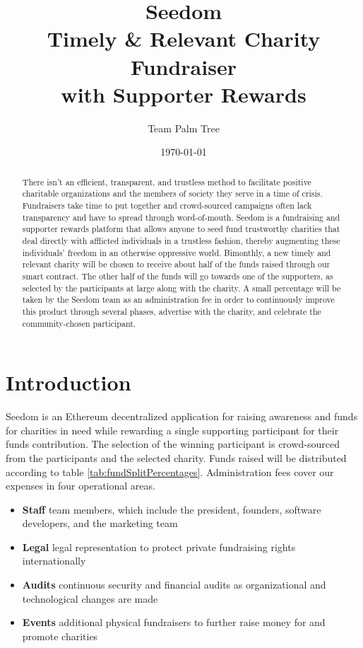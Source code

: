 \documentclass[11pt]{article}
\begin{document}
\title{%
\Huge Seedom \\[4mm]
\large Timely \& Relevant Charity Fundraiser \\[1mm]
with Supporter Rewards}
\author{Team Palm Tree}
\date{\today}
\maketitle

\begin{abstract}
There isn't an efficient, transparent, and trustless method to facilitate positive charitable organizations and the members of society they serve in a time of crisis. Fundraisers take time to put together and crowd-sourced campaigns often lack transparency and have to spread through word-of-mouth. Seedom is a fundraising and supporter rewards platform that allows anyone to seed fund trustworthy charities that deal directly with afflicted individuals in a trustless fashion, thereby augmenting these individuals' freedom in an otherwise oppressive world. Bimonthly, a new timely and relevant charity will be chosen to receive about half of the funds raised through our smart contract. The other half of the funds will go towards one of the supporters, as selected by the participants at large along with the charity. A small percentage will be taken by the Seedom team as an administration fee in order to continuously improve this product through several phases, advertise with the charity, and celebrate the community-chosen participant.
\end{abstract}
\pagebreak

\tableofcontents
\pagebreak

\section{Introduction}

Seedom is an Ethereum decentralized application for raising awareness and funds for charities in need while rewarding a single supporting participant for their funds contribution. The selection of the winning participant is crowd-sourced from the participants and the selected charity. Funds raised will be distributed according to table \ref{tab:fundSplitPercentages}. Administration fees cover our expenses in four operational areas.

\begin{itemize}
\item{\textbf{Staff} team members, which include the president, founders, software developers, and the marketing team}
\item{\textbf{Legal} legal representation to protect private fundraising rights internationally}
\item{\textbf{Audits} continuous security and financial audits as organizational and technological changes are made}
\item{\textbf{Events} additional physical fundraisers to further raise money for and promote charities}
\end{itemize}
\end{document}

